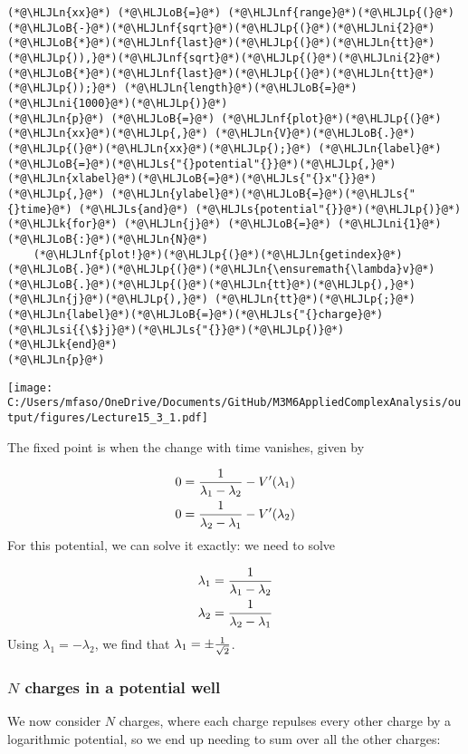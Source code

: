 \documentclass[12pt,a4paper]{article}
\newcommand{\HLJLk}[1]{\textcolor[RGB]{148,91,176}{\textbf{#1}}}
\newcommand{\HLJLn}[1]{#1}
\newcommand{\HLJLnf}[1]{\textcolor[RGB]{66,102,213}{#1}}
\newcommand{\HLJLs}[1]{\textcolor[RGB]{201,61,57}{#1}}
\newcommand{\HLJLsi}[1]{#1}
\newcommand{\HLJLni}[1]{\textcolor[RGB]{59,151,46}{#1}}
\newcommand{\HLJLoB}[1]{\textcolor[RGB]{102,102,102}{\textbf{#1}}}
\newcommand{\HLJLp}[1]{#1}
\begin{document}
\begin{lstlisting}
(*@\HLJLn{xx}@*) (*@\HLJLoB{=}@*) (*@\HLJLnf{range}@*)(*@\HLJLp{(}@*)(*@\HLJLoB{-}@*)(*@\HLJLnf{sqrt}@*)(*@\HLJLp{(}@*)(*@\HLJLni{2}@*)(*@\HLJLoB{*}@*)(*@\HLJLnf{last}@*)(*@\HLJLp{(}@*)(*@\HLJLn{tt}@*)(*@\HLJLp{)),}@*)(*@\HLJLnf{sqrt}@*)(*@\HLJLp{(}@*)(*@\HLJLni{2}@*)(*@\HLJLoB{*}@*)(*@\HLJLnf{last}@*)(*@\HLJLp{(}@*)(*@\HLJLn{tt}@*)(*@\HLJLp{));}@*) (*@\HLJLn{length}@*)(*@\HLJLoB{=}@*)(*@\HLJLni{1000}@*)(*@\HLJLp{)}@*)
(*@\HLJLn{p}@*) (*@\HLJLoB{=}@*) (*@\HLJLnf{plot}@*)(*@\HLJLp{(}@*)(*@\HLJLn{xx}@*)(*@\HLJLp{,}@*) (*@\HLJLn{V}@*)(*@\HLJLoB{.}@*)(*@\HLJLp{(}@*)(*@\HLJLn{xx}@*)(*@\HLJLp{);}@*) (*@\HLJLn{label}@*)(*@\HLJLoB{=}@*)(*@\HLJLs{"{}potential"{}}@*)(*@\HLJLp{,}@*) (*@\HLJLn{xlabel}@*)(*@\HLJLoB{=}@*)(*@\HLJLs{"{}x"{}}@*)(*@\HLJLp{,}@*) (*@\HLJLn{ylabel}@*)(*@\HLJLoB{=}@*)(*@\HLJLs{"{}time}@*) (*@\HLJLs{and}@*) (*@\HLJLs{potential"{}}@*)(*@\HLJLp{)}@*)
(*@\HLJLk{for}@*) (*@\HLJLn{j}@*) (*@\HLJLoB{=}@*) (*@\HLJLni{1}@*)(*@\HLJLoB{:}@*)(*@\HLJLn{N}@*)
    (*@\HLJLnf{plot!}@*)(*@\HLJLp{(}@*)(*@\HLJLn{getindex}@*)(*@\HLJLoB{.}@*)(*@\HLJLp{(}@*)(*@\HLJLn{\ensuremath{\lambda}v}@*)(*@\HLJLoB{.}@*)(*@\HLJLp{(}@*)(*@\HLJLn{tt}@*)(*@\HLJLp{),}@*)(*@\HLJLn{j}@*)(*@\HLJLp{),}@*) (*@\HLJLn{tt}@*)(*@\HLJLp{;}@*) (*@\HLJLn{label}@*)(*@\HLJLoB{=}@*)(*@\HLJLs{"{}charge}@*) (*@\HLJLsi{{\$}j}@*)(*@\HLJLs{"{}}@*)(*@\HLJLp{)}@*)
(*@\HLJLk{end}@*)
(*@\HLJLn{p}@*)
\end{lstlisting}

\texttt{[image: C:/Users/mfaso/OneDrive/Documents/GitHub/M3M6AppliedComplexAnalysis/output/figures/Lecture15\_3\_1.pdf]}

The fixed point is when the change with time vanishes, given by


\begin{align*}
0 = {1 \over \lambda_1 -\lambda_2} - V'(\lambda_1) \\
0 = {1 \over \lambda_2 -\lambda_1} - V'(\lambda_2)
\end{align*}
For this potential, we can solve it exactly: we need to solve


\begin{align*}
\lambda_1 = {1 \over \lambda_1 -\lambda_2}  \\
\lambda_2 = {1 \over \lambda_2 -\lambda_1}
\end{align*}
Using $\lambda_1 = -\lambda_2$, we find that $\lambda_1 = \pm{1 \over \sqrt 2}$.

\subsubsection{$N$ charges in a potential well}
We now consider $N$ charges, where each charge repulses every other charge by a logarithmic potential, so we end up needing to sum over all the other charges:
\end{document}
